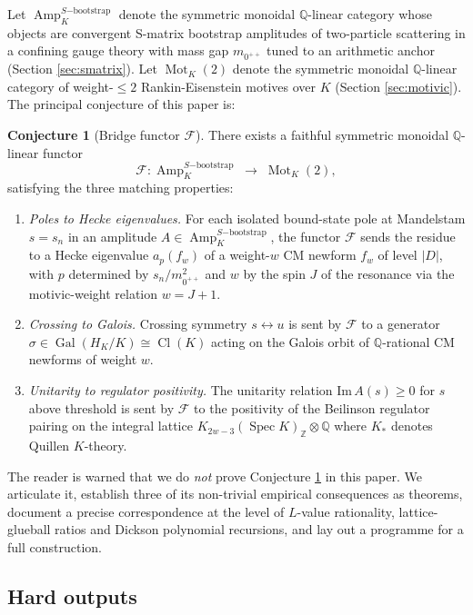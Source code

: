 \documentclass[11pt]{amsart}
\theoremstyle{definition}
\newtheorem{conjecture}[theorem]{Conjecture}
\theoremstyle{remark}
\DeclareMathOperator{\Cl}{Cl}
\DeclareMathOperator{\Gal}{Gal}
\DeclareMathOperator{\Spec}{Spec}
\DeclareMathOperator{\Amp}{Amp}
\DeclareMathOperator{\Mot}{Mot}
\newcommand{\Q}{\mathbb{Q}}
\newcommand{\Z}{\mathbb{Z}}
\newcommand{\HK}{H_K}
\begin{document}
Let $\Amp_K^{S\mathrm{-bootstrap}}$ denote the symmetric monoidal $\Q$-linear
category whose objects are convergent S-matrix bootstrap amplitudes of
two-particle scattering in a confining gauge theory with mass gap
$m_{0^{++}}$ tuned to an arithmetic anchor (Section \ref{sec:smatrix}).
Let $\Mot_K(2)$ denote the symmetric monoidal $\Q$-linear category of
weight-$\le 2$ Rankin-Eisenstein motives over $K$ (Section
\ref{sec:motivic}). The principal conjecture of this paper is:

\begin{conjecture}[Bridge functor $\mathcal{F}$]\label{conj:F}
There exists a faithful symmetric monoidal $\Q$-linear functor
\[
\mathcal{F} \colon \Amp_K^{S\mathrm{-bootstrap}} \;\longrightarrow\; \Mot_K(2),
\]
satisfying the three matching properties:
\begin{enumerate}
\item[(F1)] \emph{Poles to Hecke eigenvalues.} For each isolated bound-state pole at
Mandelstam $s = s_n$ in an amplitude $A \in \Amp_K^{S\mathrm{-bootstrap}}$, the
functor $\mathcal{F}$ sends the residue to a Hecke eigenvalue $a_p(f_w)$ of a
weight-$w$ CM newform $f_w$ of level $|D|$, with $p$ determined by
$s_n / m_{0^{++}}^2$ and $w$ by the spin $J$ of the resonance via the
motivic-weight relation $w = J + 1$.
\item[(F2)] \emph{Crossing to Galois.} Crossing symmetry $s \leftrightarrow u$ is
sent by $\mathcal{F}$ to a generator $\sigma \in \Gal(\HK/K) \cong \Cl(K)$ acting on the
Galois orbit of $\Q$-rational CM newforms of weight $w$.
\item[(F3)] \emph{Unitarity to regulator positivity.} The unitarity relation
$\mathrm{Im}\, A(s) \ge 0$ for $s$ above threshold is sent by $\mathcal{F}$ to the
positivity of the Beilinson regulator pairing on the integral lattice
$K_{2w-3}(\Spec K)_{\Z} \otimes \Q$ where $K_*$ denotes Quillen $K$-theory.
\end{enumerate}
\end{conjecture}

The reader is warned that we do \emph{not} prove Conjecture \ref{conj:F}
in this paper. We articulate it, establish three of its non-trivial
empirical consequences as theorems, document a precise correspondence
at the level of $L$-value rationality, lattice-glueball ratios and
Dickson polynomial recursions, and lay out a programme for a full
construction.

\subsection{Hard outputs}\label{ss:hard-outputs}
\end{document}
